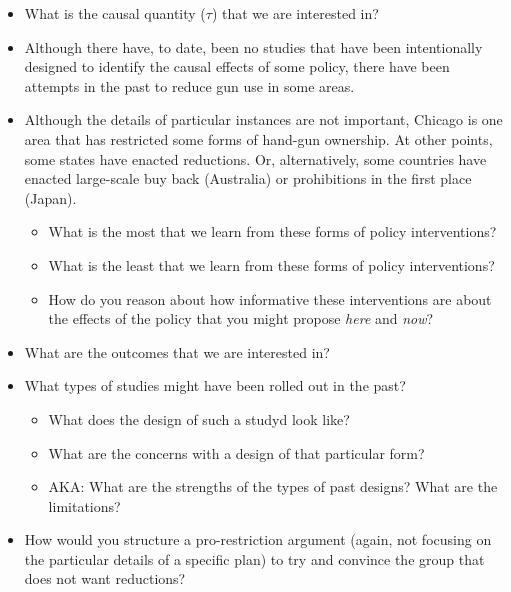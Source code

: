 \documentclass{article}
\begin{document}
\begin{itemize}
\item What is the causal quantity (\(\tau\)) that we are interested in?
\item Although there have, to date, been no studies that have been intentionally designed to identify the causal effects of some policy, there have been attempts in the past to reduce gun use in some areas.
\item Although the details of particular instances are not important, Chicago is one area that has restricted some forms of hand-gun ownership. At other points, some states have enacted reductions. Or, alternatively, some countries have enacted large-scale buy back (Australia) or prohibitions in the first place (Japan).
\begin{itemize}
\item What is the most that we learn from these forms of policy interventions?
\item What is the least that we learn from these forms of policy interventions?
\item How do you reason about how informative these interventions are about the effects of the policy that you might propose \emph{here} and \emph{now}?
\end{itemize}
\item What are the outcomes that we are interested in?
\item What types of studies might have been rolled out in the past?
\begin{itemize}
\item What does the design of such a studyd look like?
\item What are the concerns with a design of that particular form?
\item AKA: What are the strengths of the types of past designs? What are the limitations?
\end{itemize}
\item How would you structure a pro-restriction argument (again, not focusing on the particular details of a specific plan) to try and convince the group that does not want reductions?
\end{itemize}
\end{document}
